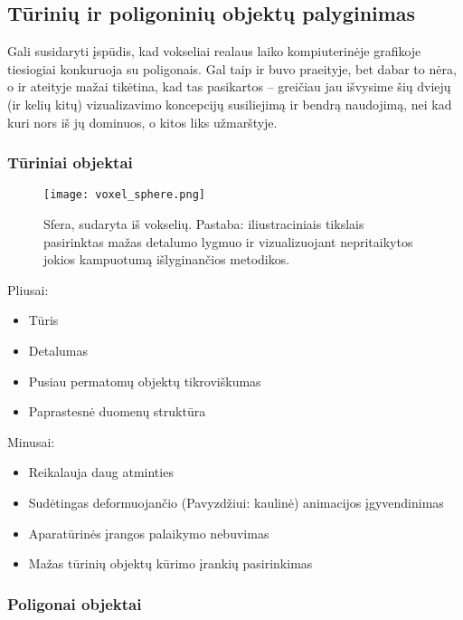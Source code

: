 \subsection{Tūrinių ir poligoninių objektų palyginimas}

Gali susidaryti įspūdis, kad vokseliai realaus laiko kompiuterinėje grafikoje
tiesiogiai konkuruoja su poligonais. Gal taip ir buvo praeityje, bet dabar to
nėra, o ir ateityje mažai tikėtina, kad tas pasikartos -- greičiau jau išvysime
šių dviejų (ir kelių kitų) vizualizavimo koncepcijų susiliejimą ir bendrą
naudojimą, nei kad kuri nors iš jų dominuos, o kitos liks užmarštyje.

\subsubsection{Tūriniai objektai}

\begin{figure}[!ht]
\centering
\texttt{[image: voxel\_sphere.png]}
\caption{Sfera, sudaryta iš vokselių. Pastaba: iliustraciniais tikslais
pasirinktas mažas detalumo lygmuo ir vizualizuojant nepritaikytos jokios
kampuotumą išlyginančios metodikos.}
\label{fig:voxel_sphere}
\end{figure}

Pliusai:

\begin{itemize}
\item Tūris
\item Detalumas
\item Pusiau permatomų objektų tikroviškumas
\item Paprastesnė duomenų struktūra
\end{itemize}

Minusai:

\begin{itemize}
\item Reikalauja daug atminties
\item Sudėtingas deformuojančio (Pavyzdžiui: kaulinė) animacijos įgyvendinimas
\item Aparatūrinės įrangos palaikymo nebuvimas
\item Mažas tūrinių objektų kūrimo įrankių pasirinkimas
\end{itemize}

\subsubsection{Poligonai objektai}

